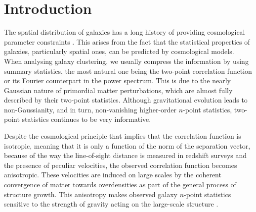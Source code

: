 \documentclass{aa}
\begin{document}

   \maketitle
%

\section{Introduction}

The spatial distribution of galaxies has a long history of providing cosmological parameter constraints \citep[e.g.][and references therein]{strauss1992redshift, vogeley1992large, maddox1996apm,peacock01, cole05,tegmark06,percival10, blake12,delatorre2013vipers,alam2017clustering, alam2020completed}. This arises from the fact that the statistical properties of galaxies, particularly spatial ones, can be predicted by cosmological models. When analysing galaxy clustering, we usually compress the information by using summary statistics, the most natural one being the two-point correlation function or its Fourier counterpart in the power spectrum. This is due to the nearly Gaussian nature of primordial matter perturbations, which are almost fully described by their two-point statistics. Although gravitational evolution leads to non-Gaussianity, and in turn, non-vanishing higher-order $n$-point statistics, two-point statistics continues to be very informative. 

Despite the cosmological principle that implies that the correlation function is isotropic, meaning that it is only a function of the norm of the separation vector, because of the way the line-of-sight distance is measured in redshift surveys and the presence of peculiar velocities, the observed correlation function becomes anisotropic. These velocities are induced on large scales by the coherent convergence of matter towards overdensities as part of the general process of structure growth. This anisotropy makes observed galaxy $n$-point statistics sensitive to the strength of gravity acting on the large-scale structure \citep{kaiser1987clustering,guzzo2008test}.
\end{document}
